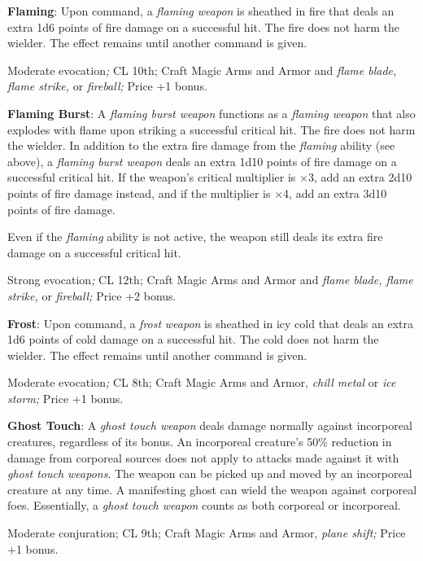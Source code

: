 \textbf{Flaming}: Upon command, a \textit{flaming weapon} is sheathed in fire that deals an extra 1d6 points of fire damage on a successful hit. The fire does not harm the wielder. The effect remains until another command is given. 
				
Moderate evocation\textit{; }CL 10th; Craft Magic Arms and Armor and \textit{flame blade, flame strike, }or \textit{fireball; }Price +1 bonus.
				
\textbf{Flaming Burst}: A \textit{flaming burst weapon} functions as a \textit{flaming weapon} that also explodes with flame upon striking a successful critical hit. The fire does not harm the wielder. In addition to the extra fire damage from the \textit{flaming} ability (see above), a \textit{flaming burst weapon} deals an extra 1d10 points of fire damage on a successful critical hit. If the weapon's critical multiplier is \mbox{$\times$}3, add an extra 2d10 points of fire damage instead, and if the multiplier is \mbox{$\times$}4, add an extra 3d10 points of fire damage. 
				
Even if the \textit{flaming} ability is not active, the weapon still deals its extra fire damage on a successful critical hit.
				
Strong evocation\textit{; }CL 12th; Craft Magic Arms and Armor and \textit{flame blade, flame strike, }or \textit{fireball; }Price +2 bonus.
				
\textbf{Frost}: Upon command, a \textit{frost} \textit{weapon} is sheathed in icy cold that deals an extra 1d6 points of cold damage on a successful hit. The cold does not harm the wielder. The effect remains until another command is given.
				
Moderate evocation\textit{; }CL 8th; Craft Magic Arms and Armor, \textit{chill metal }or \textit{ice storm; }Price +1 bonus.
				
\textbf{Ghost Touch}: A \textit{ghost touch weapon} deals damage normally against incorporeal creatures, regardless of its bonus. An incorporeal creature's 50\% reduction in damage from corporeal sources does not apply to attacks made against it with \textit{ghost touch weapons}. The weapon can be picked up and moved by an incorporeal creature at any time. A manifesting ghost can wield the weapon against corporeal foes. Essentially, a \textit{ghost touch weapon} counts as both corporeal or incorporeal.
				
Moderate conjuration; CL 9th; Craft Magic Arms and Armor, \textit{plane shift; }Price +1 bonus.
				
